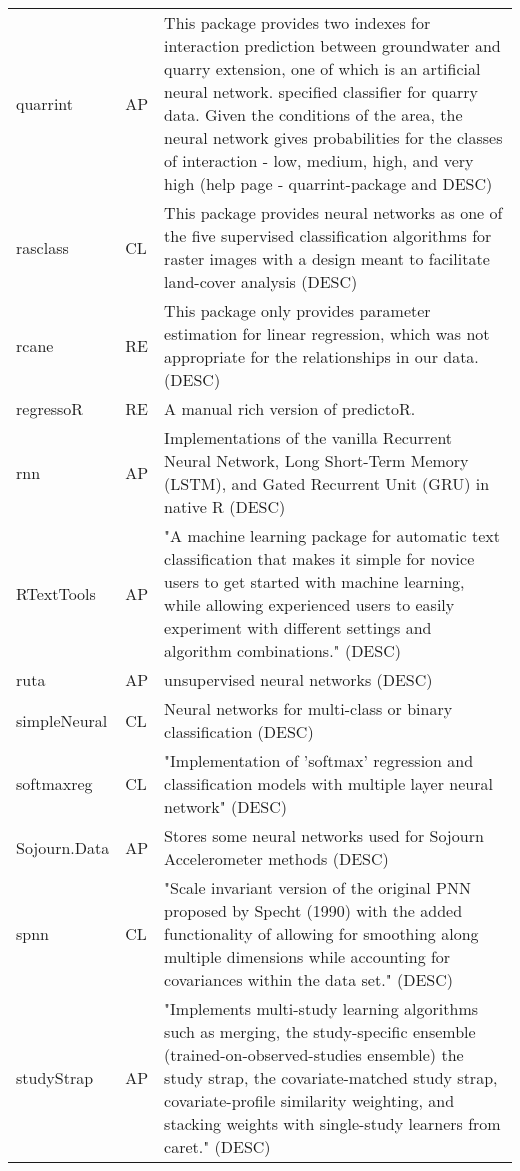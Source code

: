 \begin{Schunk}
\begin{longtable}[t]{ll>{\raggedright\arraybackslash}p{10cm}}
quarrint & AP & This package provides two indexes for interaction prediction between groundwater and quarry extension, one of which is an artificial neural network. specified classifier for quarry data. Given the conditions of the area, the neural network gives probabilities for the classes of interaction - low, medium, high, and very high (help page - quarrint-package and DESC)\\
rasclass & CL & This package provides neural networks as one of the five supervised classification algorithms for raster images with a design meant to facilitate land-cover analysis (DESC)\\
rcane & RE & This package only provides parameter estimation for linear regression, which was not appropriate for the relationships in our data. (DESC)\\
\addlinespace
regressoR & RE & A manual rich version of predictoR.\\
rnn & AP & Implementations of the vanilla Recurrent Neural Network, Long Short-Term Memory (LSTM), and Gated Recurrent Unit (GRU) in native R (DESC)\\
RTextTools & AP & "A machine learning package for automatic text classification that makes it simple for novice users to get started with machine learning, while allowing experienced users to easily experiment with different settings and algorithm combinations." (DESC)\\
ruta & AP & unsupervised neural networks (DESC)\\
simpleNeural & CL & Neural networks for multi-class or binary classification (DESC)\\
\addlinespace
softmaxreg & CL & "Implementation of 'softmax' regression and classification models with multiple layer neural network" (DESC)\\
Sojourn.Data & AP & Stores some neural networks used for Sojourn Accelerometer methods (DESC)\\
spnn & CL & "Scale invariant version of the original PNN proposed by Specht (1990) with the added functionality of allowing for smoothing along multiple dimensions while accounting for covariances within the data set." (DESC)\\
studyStrap & AP & "Implements multi-study learning algorithms such as merging, the study-specific ensemble (trained-on-observed-studies ensemble) the study strap, the covariate-matched study strap, covariate-profile similarity weighting, and stacking weights with single-study learners from caret." (DESC)\\

\end{longtable}
\end{Schunk}
